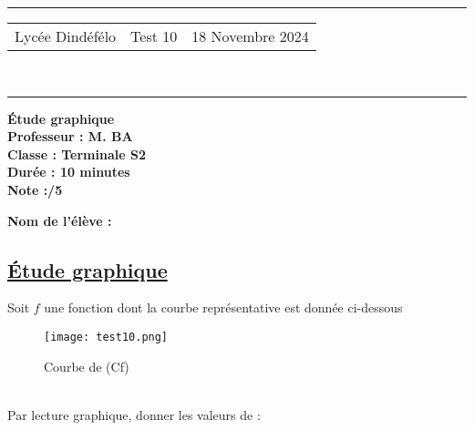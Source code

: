\documentclass[a4paper,12pt]{article}
\begin{document}
\hrule %
\begin{center}
    \begin{tabular}{@{} p{5cm} p{5cm} p{5cm} @{}} %
        Lycée Dindéfélo & \quad\quad Test 10 & 18 Novembre 2024 \\
    \end{tabular}
    \\[-0.01cm] %
    \hrule %
\end{center}
\begin{center}
    \textbf{\Large Étude graphique} \\[0.2cm]
    \textbf{\large Professeur : M. BA} \\[0.2cm]
    \textbf{Classe : Terminale S2} \\[0.2cm]
    \textbf{\small Durée : 10 minutes} \\[0.2cm]
    \textbf{\small Note :\quad\quad /5}
\end{center}

\textbf{\small Nom de l'élève :} \underline{\hspace{8cm}} \\[0.5cm]

\subsection*{\underline{Étude graphique}}
Soit $f$ une fonction dont la courbe représentative est donnée ci-dessous
\begin{figure}[h]%
\centering
\texttt{[image: test10.png]}
\caption{Courbe de (Cf)}
\label{fig:monimage}
\end{figure}\\
Par lecture graphique, donner les valeurs de :\\
\end{document}
